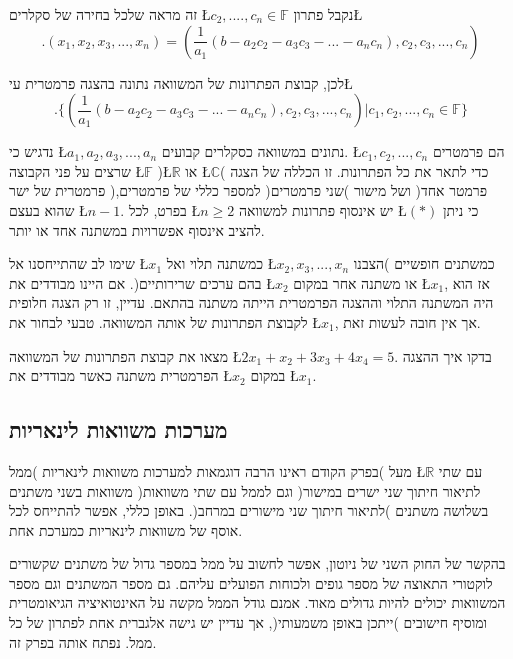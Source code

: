 זה מראה שלכל בחירה של סקלרים \L{$c_{2},....,c_{n}\in\mathbb{F}$}
נקבל פתרון\L{%
\[
.(x_{1},x_{2},x_{3},...,x_{n})=(\frac{1}{a_{1}}(b-a_{2}c_{2}-a_{3}c_{3}-...-a_{n}c_{n}),c_{2},c_{3},...,c_{n})
\]
}%

לכן, קבוצת הפתרונות של המשוואה נתונה בהצגה פרמטרית ע\textquotedbl י\L{%
\[
.\{(\frac{1}{a_{1}}(b-a_{2}c_{2}-a_{3}c_{3}-...-a_{n}c_{n}),c_{2},c_{3},...,c_{n})|c_{1},c_{2},...,c_{n}\in\mathbb{F}\}
\]
}%

נדגיש כי \L{$a_{1},a_{2},a_{3},...,a_{n}$} נתונים במשוואה כסקלרים
קבועים. \L{$c_{1},c_{2},...,c_{n}$} הם פרמטרים שרצים על פני הקבוצה
\L{$\mathbb{F}$} )\L{$\mathbb{R}$} או \L{$\mathbb{C}$}( כדי לתאר
את כל הפתרונות. זו הכללה של הצגה פרמטרית של ישר )פרמטר אחד( ושל מישור
)שני פרמטרים( למספר כללי של פרמטרים, שהוא בעצם \L{$n-1$}. בפרט, לכל
\L{$n\geq2$} יש אינסוף פתרונות למשוואה \L{$(*)$} כי ניתן להציב אינסוף
אפשרויות במשתנה אחד או יותר.

שימו לב שהתייחסנו אל \L{$x_{1}$} כמשתנה תלוי ואל \L{$x_{2},x_{3},...,x_{n}$}
כמשתנים חופשיים )הצבנו בהם ערכים שרירותיים(. אם היינו מבודדים את \L{$x_{2}$}
או משתנה אחר במקום \L{$x_{1}$}, אז הוא היה המשתנה התלוי וההצגה הפרמטרית
הייתה משתנה בהתאם. עדיין, זו רק הצגה חלופית לקבוצת הפתרונות של אותה
המשוואה. טבעי לבחור את \L{$x_{1}$}, אך אין חובה לעשות זאת.

\begin{self}
מצאו את קבוצת הפתרונות של המשוואה \L{$2x_{1}+x_{2}+3x_{3}+4x_{4}=5$}.
בדקו איך ההצגה הפרמטרית משתנה כאשר מבודדים את \L{$x_{2}$} במקום \L{$x_{1}$}.
\end{self}

\subsection{מערכות משוואות לינאריות}

בפרק הקודם ראינו הרבה דוגמאות למערכות משוואות לינאריות )ממ\textquotedbl ל(
מעל \L{$\mathbb{R}$} עם שתי משוואות בשני משתנים )לתיאור חיתוך שני
ישרים במישור( וגם לממ\textquotedbl ל עם שתי משוואות בשלושה משתנים
)לתיאור חיתוך שני מישורים במרחב(. באופן כללי, אפשר להתייחס לכל אוסף
של משוואות לינאריות כמערכת אחת.

בהקשר של החוק השני של ניוטון, אפשר לחשוב על ממ\textquotedbl ל במספר
גדול של משתנים שקשורים לוקטורי התאוצה של מספר גופים ולכוחות הפועלים
עליהם. גם מספר המשתנים וגם מספר המשוואות יכולים להיות גדולים מאוד.
אמנם גודל הממ\textquotedbl ל מקשה על האינטואיציה הגיאומטרית ומוסיף
חישובים )ייתכן באופן משמעותי(, אך עדיין יש גישה אלגברית אחת לפתרון
של כל ממ\textquotedbl ל. נפתח אותה בפרק זה.

